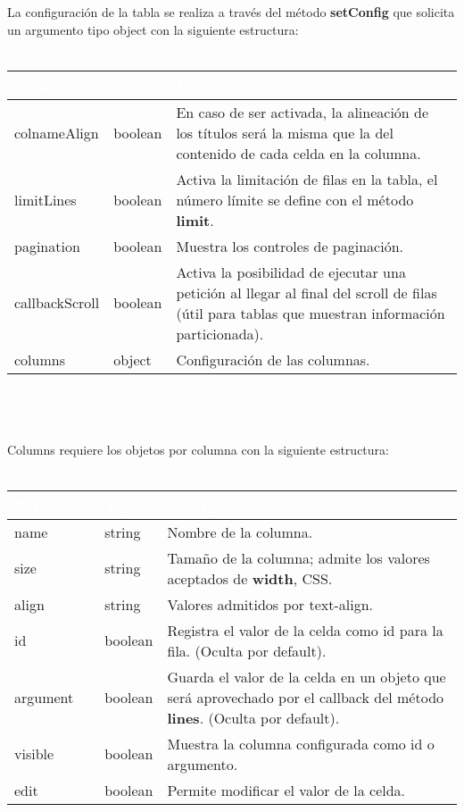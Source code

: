 \documentclass[10pt]{article}
\begin{document}
La configuración de la tabla se realiza a través del método \textbf{setConfig} que solicita un argumento tipo object con la siguiente estructura:
\\\\
\begin{tabular}{|m{2.2cm}|m{1.5cm}|m{11.5cm}|}
	\hline
	\rowcolor{black}\textcolor{white}{Parámetro} & \textcolor{white}{Tipo} & \textcolor{white}{Descripción} \\
	\hline
    colnameAlign & boolean & En caso de ser activada, la alineación de los títulos será la misma que la del contenido de cada celda en la columna. \\
    \hline
    limitLines & boolean & Activa la limitación de filas en la tabla, el número límite se define con el método \textbf{limit}. \\
    \hline
    pagination & boolean & Muestra los controles de paginación. \\
    \hline
    callbackScroll & boolean & Activa la posibilidad de ejecutar una petición al llegar al final del scroll de filas (útil para tablas que muestran información particionada). \\ 
    \hline
    columns & object & Configuración de las columnas. \\
    \hline
\end{tabular}
\\\\\\
Columns requiere los objetos por columna con la siguiente estructura:
\\\\
\begin{tabular}{|m{2.2cm}|m{1.5cm}|m{11.5cm}|}
	\hline
	\rowcolor{black}\textcolor{white}{Parámetro} & \textcolor{white}{Tipo} & \textcolor{white}{Descripción} \\
	\hline
	name & string & Nombre de la columna. \\
	\hline
	size & string & Tamaño de la columna; admite los valores aceptados de \textbf{width}, CSS. \\
	\hline
	align & string & Valores admitidos por text-align. \\
	\hline
	id & boolean & Registra el valor de la celda como id para la fila. (Oculta por default). \\
	\hline
	argument & boolean & Guarda el valor de la celda en un objeto que será aprovechado por el callback del método \textbf{lines}. (Oculta por default). \\
	\hline
	visible & boolean & Muestra la columna configurada como id o argumento. \\
	\hline
	edit & boolean & Permite modificar el valor de la celda. \\
	\hline
\end{tabular}
\end{document}
